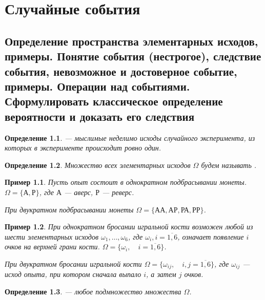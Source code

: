 \documentclass[a4paper]{report}
\theoremstyle{indented}
\newtheorem{definition}{Определение}[section]
\newtheorem{example}{Пример}[section]
\begin{document}
\chapter{Случайные события}

\section{Определение пространства элементарных исходов, примеры.
Понятие события (нестрогое), следствие события, невозможное и достоверное событие, примеры.
Операции над событиями.
Сформулировать классическое определение вероятности и доказать его следствия}

\begin{definition}
	\label{def:outcomes}
	 — мыслимые неделимо исходы случайного эксперимента, из которых в эксперименте происходит ровно один.
\end{definition}

\begin{definition}
	\label{def:sample-space}
	Множество всех элементарных исходов $\Omega$ будем называть .
\end{definition}

\begin{example}
	\label{xmp:coin-toss-sample-space}
	Пусть опыт состоит в однократном подбрасывании монеты.
	$\Omega = \{\text{А}, \text{Р}\}$, где $\text{А}$ — аверс, $\text{Р}$ — реверс.

	При двукратном подбрасывании монеты $\Omega = \{\text{АА}, \text{АР}, \text{РА}, \text{РР}\}$.
\end{example}

\begin{example}
	\label{xmp:dice-toss-sample-space}
	При однократном бросании игральной кости возможен любой из шести элементарных исходов $\omega_1, \dots, \omega_6$, где $\omega_i, i=\overline{1, 6}$, означает появление $i$ очков на верхней грани кости.
	$\Omega = \{\omega_i,\quad i = \overline{1, 6}\}$.

	При двукратном бросании игральной кости $\Omega = \{\omega_{ij},\quad i, j = \overline{1, 6}\}$, где $\omega_{ij}$ — исход опыта, при котором сначала выпало $i$, а затем $j$ очков.
\end{example}

\begin{definition}
	\label{def:event}
	 — любое подмножество множества $\Omega$.
\end{definition}
\end{document}
